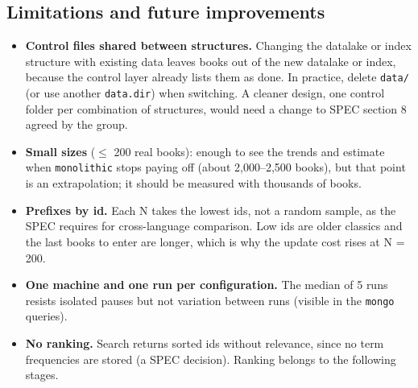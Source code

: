 \documentclass[11pt,a4paper]{article}
\newcommand{\code}[1]{\texttt{#1}}
\begin{document}
\subsection{Limitations and future improvements}
\begin{itemize}
  \item \textbf{Control files shared between structures.} Changing the datalake or index structure
        with existing data leaves books out of the new datalake or index, because the control layer
        already lists them as done. In practice, delete \code{data/} (or use another
        \code{data.dir}) when switching. A cleaner design, one control folder per combination of
        structures, would need a change to SPEC section 8 agreed by the group.
  \item \textbf{Small sizes} ($\le$ 200 real books): enough to see the trends and estimate when
        \code{monolithic} stops paying off (about 2,000--2,500 books), but that point is an
        extrapolation; it should be measured with thousands of books.
  \item \textbf{Prefixes by id.} Each N takes the lowest ids, not a random sample, as the SPEC
        requires for cross-language comparison. Low ids are older classics and the last books to
        enter are longer, which is why the update cost rises at N = 200.
  \item \textbf{One machine and one run per configuration.} The median of 5 runs resists isolated
        pauses but not variation between runs (visible in the \code{mongo} queries).
  \item \textbf{No ranking.} Search returns sorted ids without relevance, since no term frequencies
        are stored (a SPEC decision). Ranking belongs to the following stages.
\end{itemize}
\end{document}
